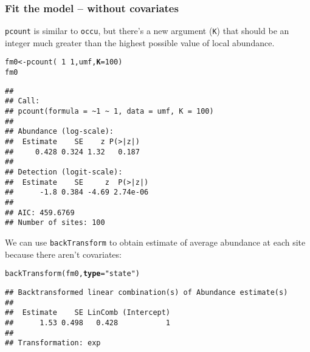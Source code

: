 \documentclass[color=usenames,dvipsnames]{beamer}\usepackage[]{graphicx}\usepackage[]{xcolor}
\makeatletter
\newcommand{\hlnum}[1]{\textcolor[rgb]{0.69,0.494,0}{#1}}%
\newcommand{\hlsng}[1]{\textcolor[rgb]{0.749,0.012,0.012}{#1}}%
\newcommand{\hlopt}[1]{\textcolor[rgb]{0,0,0}{#1}}%
\newcommand{\hldef}[1]{\textcolor[rgb]{0,0,0}{#1}}%
\newcommand{\hlkwb}[1]{\textcolor[rgb]{0,0.341,0.682}{#1}}%
\newcommand{\hlkwc}[1]{\textcolor[rgb]{0,0,0}{\textbf{#1}}}%
\newcommand{\hlkwd}[1]{\textcolor[rgb]{0.004,0.004,0.506}{#1}}%
\newenvironment{kframe}{%
 \def\at@end@of@kframe{}%
 \ifinner\ifhmode%
  \def\at@end@of@kframe{\end{minipage}}%
  \begin{minipage}{\columnwidth}%
 \fi\fi%
 \def\FrameCommand##1{\hskip\@totalleftmargin \hskip-\fboxsep
 \colorbox{shadecolor}{##1}\hskip-\fboxsep
     \hskip-\linewidth \hskip-\@totalleftmargin \hskip\columnwidth}%
 \MakeFramed {\advance\hsize-\width
   \@totalleftmargin\z@ \linewidth\hsize
   \@setminipage}}%
 {\par\unskip\endMakeFramed%
 \at@end@of@kframe}
\newenvironment{knitrout}{}{} %
\newcommand{\inr}[1]{\colorbox{inlinecolor}{\texttt{#1}}}
\makeatother
\begin{document}
\begin{frame}[fragile]
  \frametitle{Fit the model -- without covariates}
  \footnotesize
  \inr{pcount} is similar to \inr{occu}, but there's a new argument
  (\texttt{K}) that should be an integer much 
  greater than the highest possible value of local abundance. 
\begin{knitrout}\tiny
{}\color{fgcolor}\begin{kframe}
\begin{alltt}
\hldef{fm0} \hlkwb{<-} \hlkwd{pcount}\hldef{(}\hlopt{~}\hlnum{1} \hlopt{~}\hlnum{1}\hldef{, umf,} \hlkwc{K}\hldef{=}\hlnum{100}\hldef{)}
\hldef{fm0}
\end{alltt}
\begin{verbatim}
## 
## Call:
## pcount(formula = ~1 ~ 1, data = umf, K = 100)
## 
## Abundance (log-scale):
##  Estimate    SE    z P(>|z|)
##     0.428 0.324 1.32   0.187
## 
## Detection (logit-scale):
##  Estimate    SE     z  P(>|z|)
##      -1.8 0.384 -4.69 2.74e-06
## 
## AIC: 459.6769 
## Number of sites: 100
\end{verbatim}
\end{kframe}
\end{knitrout}
\pause
\vfill
We can use \inr{backTransform} to obtain estimate of average abundance
at each site because there aren't covariates:  
\begin{knitrout}\tiny
{}\color{fgcolor}\begin{kframe}
\begin{alltt}
\hlkwd{backTransform}\hldef{(fm0,} \hlkwc{type}\hldef{=}\hlsng{"state"}\hldef{)}
\end{alltt}
\begin{verbatim}
## Backtransformed linear combination(s) of Abundance estimate(s)
## 
##  Estimate    SE LinComb (Intercept)
##      1.53 0.498   0.428           1
## 
## Transformation: exp
\end{verbatim}
\end{kframe}
\end{knitrout}
\end{frame}
\end{document}
